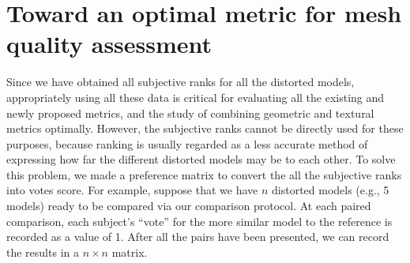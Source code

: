\section{Toward an optimal metric for mesh quality assessment}
Since we have obtained all subjective ranks for all the distorted models, appropriately using all these data is critical for evaluating all the existing and newly proposed metrics, and the study of combining geometric and textural metrics optimally. However, the subjective ranks cannot be directly used for these purposes, because ranking is usually regarded as a less accurate method of expressing how far the different distorted models may be to each other.  To solve this problem, we made a preference matrix \cite{Ledda_2005} to convert the all the subjective ranks into votes score. For example, suppose that we have $n$ distorted models (e.g., 5 models) ready to be compared via our comparison protocol.   At each paired comparison, each subject’s “vote” for the more similar model to the reference is recorded as a value of 1. After all the pairs have been presented, we can record the results in a $n \times n$ matrix.